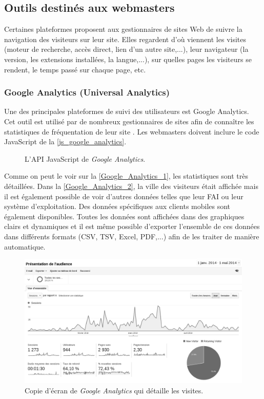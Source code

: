 \subsection{Outils destinés aux webmasters}
Certaines plateformes proposent aux gestionnaires de sites Web de suivre la navigation des visiteurs sur leur site. Elles regardent d'où viennent les visites (moteur de recherche, accès direct, lien d'un autre site,...), leur navigateur (la version, les extensions installées, la langue,...), sur quelles pages les visiteurs se rendent, le temps passé sur chaque page, etc.

\subsubsection{Google Analytics (Universal Analytics)}
\label{google_analytics}
Une des principales plateformes de suivi des utilisateurs est Google Analytics. Cet outil est utilisé par de nombreux gestionnaires de sites afin de connaître les statistiques de fréquentation de leur site \cite{javascript_google_analytics}. Les webmasters doivent inclure le code JavaScript de la \autoref{js_google_analytics}.

\begin{figure}[!h]
	\centering
	
	\caption{\label{js_google_analytics}L'API JavaScript de \textit{Google Analytics}.}
\end{figure}

Comme on peut le voir sur la \autoref{Google_Analytics_1}, les statistiques sont très détaillées. Dans la \autoref{Google_Analytics_2}, la ville des visiteurs était affichée mais il est également possible de voir d'autres données telles que leur FAI ou leur système d'exploitation. Des données spécifiques aux clients mobiles sont également disponibles. Toutes les données sont affichées dans des graphiques clairs et dynamiques et il est même possible d'exporter l'ensemble de ces données dans différents formats (CSV, TSV, Excel, PDF,...) afin de les traiter de manière automatique.

\begin{figure}[!h]
	\centering
	\includegraphics[scale=0.5]{figures/Google_Analytics_1_NB.png}
	\caption{\label{Google_Analytics_1}Copie d'écran de \textit{Google Analytics} qui détaille les visites.}
\end{figure}

